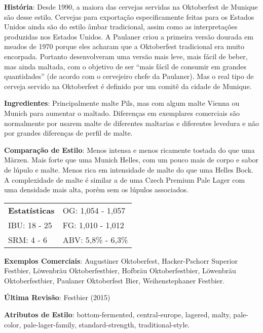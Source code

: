 \textbf{História}: Desde 1990, a maiora das cervejas servidas na Oktoberfest de Munique são desse estilo. Cervejas para exportação especificamente feitas para os Estados Unidos ainda são do estilo âmbar tradicional, assim como as interpretações produzidas nos Estados Unidos. A Paulaner criou a primeira versão dourada em meados de 1970 porque eles acharam que a Oktoberfest tradicional era muito encorpada. Portanto desenvolveram uma versão mais leve, mais fácil de beber, mas ainda maltada, com o objetivo de ser “mais fácil de consumir em grandes quantidades” (de acordo com o cervejeiro chefe da Paulaner). Mas o real tipo de cerveja servido na Oktoberfest é definido por um comitê da cidade de Munique.

\textbf{Ingredientes}: Principalmente malte Pils, mas com algum malte Vienna ou Munich para aumentar o maltado. Diferenças em exemplares comerciais são normalmente por usarem malte de diferentes maltarias e diferentes levedura e não por grandes diferenças de perfil de malte.

\textbf{Comparação de Estilo}: Menos intensa e menos ricamente tostada do que uma Märzen. Mais forte que uma Munich Helles, com um pouco mais de corpo e sabor de lúpulo e malte. Menos rica em intensidade de malte do que uma Helles Bock. A complexidade de malte é similar a de uma Czech Premium Pale Lager com uma densidade mais alta, porém sem os lúpulos associados.

\begin{tabular}{@{}p{35mm}p{35mm}@{}}
  \textbf{Estatísticas} & OG: 1,054 - 1,057 \\
  IBU: 18 - 25  & FG: 1,010 - 1,012  \\
  SRM: 4 - 6   & ABV: 5,8\% - 6,3\%
\end{tabular}

\textbf{Exemplos Comerciais}: Augustiner Oktoberfest, Hacker-Pschorr Superior Festbier, Löwenbräu Oktoberfestbier, Hofbräu Oktoberfestbier, Löwenbräu Oktoberfestbier, Paulaner Oktoberfest Bier, Weihenstephaner Festbier.

\textbf{Última Revisão}: Festbier (2015)

\textbf{Atributos de Estilo}: bottom-fermented, central-europe, lagered, malty, pale-color, pale-lager-family, standard-strength, traditional-style.
